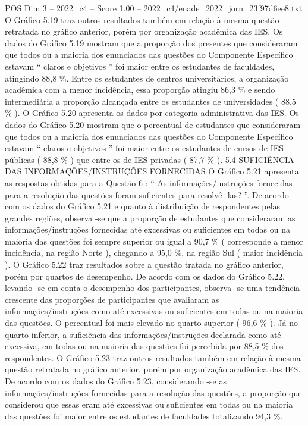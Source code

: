 \begin{textsample}{POS Dim 3 – 2022\_c4 – Score 1.00 – 2022\_c4/enade\_2022\_jorn\_23f97d6ee8.txt}
O Gráfico 5.19 traz outros resultados também em relação à mesma questão retratada no gráfico anterior, porém por organização acadêmica das IES.
Os dados do Gráfico 5.19 mostram que a proporção dos presentes que consideraram que todos ou a maioria dos enunciados das questões do Componente Específico estavam “ claros e objetivos ” foi maior entre os estudantes de faculdades, atingindo 88,8 \%.
Entre os estudantes de centros universitários, a organização acadêmica com a menor incidência, essa proporção atingiu 86,3 \% e sendo intermediária a proporção alcançada entre os estudantes de universidades ( 88,5 \% ).
O Gráfico 5.20 apresenta os dados por categoria administrativa das IES.
Os dados do Gráfico 5.20 mostram que o percentual de estudantes que consideraram que todos ou a maioria dos enunciados das questões do Componente Específico estavam “ claros e objetivos ” foi maior entre os estudantes de cursos de IES públicas ( 88,8 \% ) que entre os de IES privadas ( 87,7 \% ). 5.4 SUFICIÊNCIA DAS INFORMAÇÕES/INSTRUÇÕES FORNECIDAS O Gráfico 5.21 apresenta as respostas obtidas para a Questão 6 : “ As informações/instruções fornecidas para a resolução das questões foram suficientes para resolvê -las? ”.
De acordo com os dados do Gráfico 5.21 e quanto à distribuição de respondentes pelas grandes regiões, observa -se que a proporção de estudantes que consideraram as informações/instruções fornecidas até excessivas ou suficientes em todas ou na maioria das questões foi sempre superior ou igual a 90,7 \% ( corresponde a menor incidência, na região Norte ), chegando a 95,0 \%, na região Sul ( maior incidência ).
O Gráfico 5.22 traz resultados sobre a questão tratada no gráfico anterior, porém por quartos de desempenho.
De acordo com os dados do Gráfico 5.22, levando -se em conta o desempenho dos participantes, observa -se uma tendência crescente das proporções de participantes que avaliaram as informações/instruções como até excessivas ou suficientes em todas ou na maioria das questões.
O percentual foi mais elevado no quarto superior ( 96,6 \% ).
Já no quarto inferior, a suficiência das informações/instruções declarada como até excessiva, em todas ou na maioria das questões foi percebida por 88,5 \% dos respondentes.
O Gráfico 5.23 traz outros resultados também em relação à mesma questão retratada no gráfico anterior, porém por organização acadêmica das IES.
De acordo com os dados do Gráfico 5.23, considerando -se as informações/instruções fornecidas para a resolução das questões, a proporção que considerou que essas eram até excessivas ou suficientes em todas ou na maioria das questões foi maior entre os estudantes de faculdades totalizando 94,3 \%.

\end{textsample}
